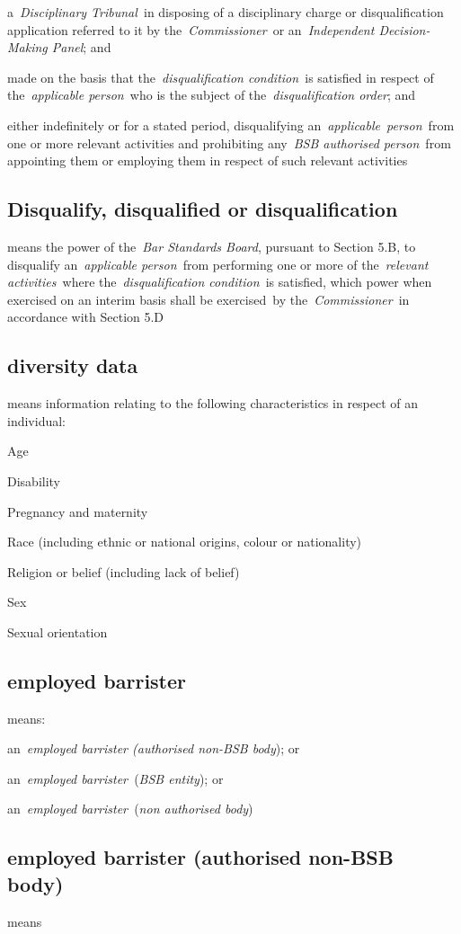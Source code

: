   a~\emph{Disciplinary Tribunal~}in disposing of a disciplinary charge
  or disqualification application referred to it by
  the~\emph{Commissioner}~or an~\emph{Independent Decision-Making
  Panel}; and \item made on the basis that the~\emph{disqualification
  condition~}is satisfied in respect of the~\emph{applicable person~}who
  is the subject of the~\emph{disqualification order}; and \item  either
  indefinitely or for a stated period, disqualifying
  an~\emph{applicable~person}~from one or more relevant activities and
  prohibiting any~\emph{BSB authorised person}~from appointing them or
  employing them in respect of such relevant activities \la  \subsection{Disqualify, disqualified or disqualification } means the
  power of the~\emph{Bar Standards Board}, pursuant to Section 5.B, to
  disqualify an~\emph{applicable person~}from performing one or more of
  the~\emph{relevant activities~}where the~\emph{disqualification
  condition~}is satisfied, which power when exercised on an interim
  basis shall be exercised~by the~\emph{Commissioner}~in accordance with
  Section 5.D  \subsection{diversity data } means information relating to the following
  characteristics in respect of an individual:
\al
\item Age
\item Disability
\item Pregnancy and maternity
\item Race (including ethnic or national origins,
  colour or nationality)
\item Religion or belief (including lack of
  belief)
  \item Sex
  \item Sexual orientation
\la
{}  \subsection{employed barrister } means: \al \item an~\emph{employed barrister
  (authorised non-BSB body}); or \item  an~\emph{employed
  barrister~}(\emph{BSB entity}); or \item an~\emph{employed
  barrister~}(\emph{non authorised body})\la  \subsection{employed barrister (authorised non-BSB body) } means

